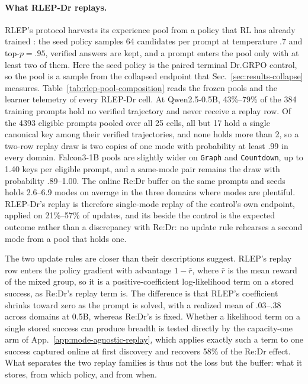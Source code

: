 \paragraph{What RLEP-Dr replays.}
\label{app:rlep-pool}
RLEP's protocol harvests its experience pool from a policy that RL has
already trained \citep{zhang2025rlep}: the seed policy samples 64 candidates
per prompt at temperature $.7$ and top-$p=.95$, verified answers are kept, and
a prompt enters the pool only with at least two of them. Here the seed policy
is the paired terminal Dr.GRPO control, so the pool is a sample from the
collapsed endpoint that Sec.~\ref{sec:results-collapse} measures.
Table~\ref{tab:rlep-pool-composition} reads the frozen pools and the learner
telemetry of every RLEP-Dr cell. At Qwen2.5-0.5B,
43\%--79\% of the 384 training prompts hold
no verified trajectory and never receive a replay row. Of the
4393 eligible prompts pooled over all 25
cells, all but 17 hold a single canonical key among
their verified trajectories, and none holds more than 2, so a
two-row replay draw is two copies of one mode with probability at least
.99 in every domain.
Falcon3-1B pools are slightly wider on \texttt{Graph} and \texttt{Countdown},
up to 1.40 keys per eligible prompt, and a same-mode pair
remains the draw with probability
.89--1.00. The online Re:Dr buffer on the
same prompts and seeds holds 2.6--6.9 modes on average
in the three domains where modes are plentiful. RLEP-Dr's replay is therefore
single-mode replay of the control's own endpoint, applied on
21\%--57\% of updates, and its \pmd{} beside the
control is the expected outcome rather than a discrepancy with Re:Dr: no
update rule rehearses a second mode from a pool that holds one.

The two update rules are closer than their descriptions suggest. RLEP's
replay row enters the policy gradient with advantage $1-\bar r$, where
$\bar r$ is the mean reward of the mixed group, so it is a positive-coefficient
log-likelihood term on a stored success, as Re:Dr's replay term is. The
difference is that RLEP's coefficient shrinks toward zero as the prompt is
solved, with a realized mean of .03--.38 across domains
at 0.5B, whereas Re:Dr's is fixed. Whether a likelihood term on a single
stored success can produce breadth is tested directly by the capacity-one arm
of App.~\ref{app:mode-agnostic-replay}, which applies exactly such a term to
one success captured online at first discovery and recovers 58\% of
the Re:Dr effect. What separates the two replay families is thus not the loss
but the buffer: what it stores, from which policy, and from when.

